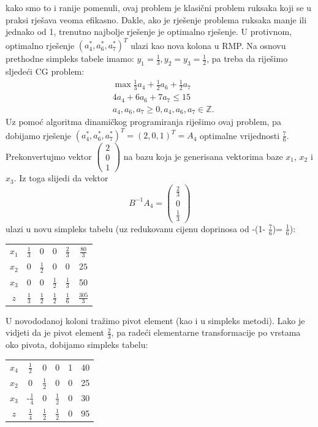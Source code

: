 \documentclass[a4paper, utf8, 11pt, colorlinks]{book}
\begin{document}
kako smo to i ranije pomenuli, ovaj problem je klasični problem ruksaka koji se u praksi rješava veoma efikasno. Dakle, ako je rješenje problema ruksaka manje ili jednako od 1, trenutno najbolje rješenje je optimalno rješenje. U protivnom, optimalno rješenje $(a_4^*, a_6^*, a_7^*)^T$ ulazi kao nova kolona u RMP. Na osnovu prethodne simpleks tabele imamo: $y_1 = \frac{1}{3}, y_2 = y_3 = \frac{1}{2}$, pa treba da riješimo sljedeći CG problem:
\begin{align*}
      &\max \frac{1}{3} a_4 + \frac{1}{2} a_6 + \frac{1}{2} a_7 \\
      & 4 a_4 + 6 a_6 + 7 a_7 \leq 15 \\
      & 	a_4, a_6, a_7 \geq 0, a_4, a_6, a_7 \in \mathbb{Z}.
\end{align*}
Uz pomoć algoritma dinamičkog programiranja riješimo ovaj problem, pa dobijamo rješenje 
$(a_4^*, a_6^*, a_7^*)^T =  (2, 0, 1)^T=A_4$ optimalne vrijednosti $\frac{7}{6}$. Prekonvertujmo vektor $\begin{pmatrix}
	2\\
    0 \\
    1
\end{pmatrix}$
na bazu koja je generisana vektorima baze $x_1$, $x_2$ i $x_3$.  Iz toga slijedi da vektor 
$$ B^{-1}A_4 = \begin{pmatrix}
	  \frac{2}{3} \\
	  0           \\
	  \frac{1}{3}
\end{pmatrix}$$ ulazi u novu simpleks tabelu (uz redukovanu cijenu doprinosa od -(1- $\frac{7}{6}$)= $\frac{1}{6}$):

\begin{center}
	
	\begin{tabular}{ccccc|c}
		$x_1$ &     $\frac{1}{3}$  &   0 & 0  &      $ \frac{2}{3}$           & $\frac{80}{3}$ \\
		$x_2$ &     0              &  $\frac{1}{2}$  & 0     & 0                 &     $25$ \\
		$x_3$ &     0              &  0    &  $\frac{1}{2}$  & $ \frac{1}{3}$    & 50 \\ \hline
		$z$   &  $\frac{1}{3}$     &  $\frac{1}{2}$   &  $\frac{1}{2}$ &   $\frac{1}{6}$   & $\frac{305}{3}$ 
	\end{tabular}
\end{center}
U novododanoj koloni tražimo pivot element (kao i u simpleks metodi). Lako je vidjeti da je pivot element $\frac{2}{3}$, pa radeći elementarne transformacije po vrstama oko pivota, dobijamo simpleks tabelu:
\begin{center}
	\begin{tabular}{ccccc| c}
		  $x_4$ & $\frac{1}{2}$ & 0 & 0 & 1 & 40 \\
		  $x_2$ & 0 & $\frac{1}{2}$ & 0 & 0 & 25 \\
		  $x_3$ & -$\frac{1}{4}$ & 0 & $\frac{1}{2}$ & 0 & 30 \\ \hline
		  $z$ & $\frac{1}{4}$ & $\frac{1}{2}$ & $\frac{1}{2}$ & 0 & 95 
	\end{tabular}
\end{center}
\end{document}

